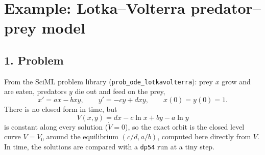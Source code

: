 \documentclass[11pt,a4paper]{article}
\begin{document}
\section*{Example: Lotka--Volterra predator--prey model}

\subsection*{1. Problem}
From the SciML problem library (\texttt{prob\_ode\_lotkavolterra}): prey $x$
grow and are eaten, predators $y$ die out and feed on the prey,
\begin{equation*}
  x' = a x - b x y, \qquad y' = -c y + d x y, \qquad x(0) = y(0) = 1 .
\end{equation*}
There is no closed form in time, but
\begin{equation*}
  V(x, y) = d x - c \ln x + b y - a \ln y
\end{equation*}
is constant along every solution ($\dot V = 0$), so the exact orbit is the
closed level curve $V = V_0$ around the equilibrium $(c/d, a/b)$, computed
here directly from $V$. In time, the solutions are compared with a
\texttt{dp54} run at a tiny step.
\begin{center}
\small

\end{center}
\end{document}
